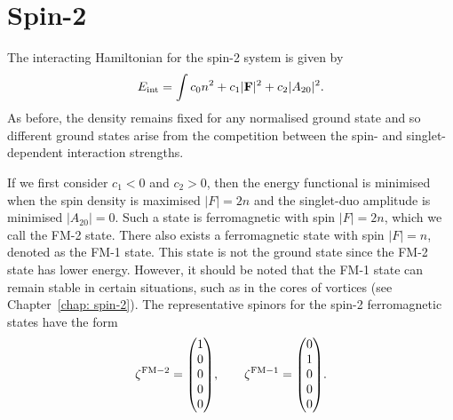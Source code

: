 \section{Spin-2}
The interacting Hamiltonian for the spin-2 system is given by
\begin{equation}
    E_\mathrm{int} = \int c_0n^2 + c_1|\vb{F}|^2+c_2|A_{20}|^2.
\end{equation}
As before, the density remains fixed for any normalised ground state and so
different ground states arise from the competition between the spin-
and singlet-dependent interaction strengths.

If we first consider \(c_1 < 0\) and \(c_2 > 0\), then the energy functional is
minimised when  the spin density is maximised \(|F|=2n\)
and the singlet-duo amplitude is minimised \(|A_{20}|=0\).
Such a state is ferromagnetic with spin \(|F|=2n\), which we call the FM-2
state.
There also exists a ferromagnetic state with spin \(|F|=n\), denoted as the FM-1
state.
This state is not the ground state since the FM-2 state has lower
energy.
However, it should be noted that the FM-1 state can remain stable in
certain situations, such as in the cores of vortices (see
Chapter~\ref{chap: spin-2}).
The representative spinors for the spin-2 ferromagnetic states have the form
\begin{equation}
    \zeta^\mathrm{FM-2} = \mqty(1 \\ 0 \\ 0 \\ 0 \\ 0), \qquad
    \zeta^\mathrm{FM-1} = \mqty(0 \\ 1 \\ 0 \\ 0 \\ 0).
\end{equation}

